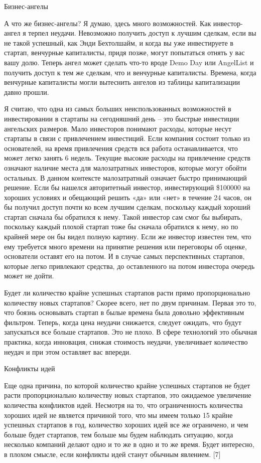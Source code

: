 \documentclass[ebook,12pt,oneside,openany]{memoir}
\begin{document}
Бизнес-ангелы

А что же бизнес-ангелы? Я думаю, здесь много возможностей. Как
инвестор-ангел я терпел неудачи. Невозможно получить доступ к лучшим
сделкам, если вы не такой успешный, как Энди Бехтолшайм, и когда вы
уже инвестируете в стартап, венчурные капиталисты, придя позже, могут
попытаться отнять у вас вашу долю. Теперь ангел может сделать что-то
вроде Demo Day или AngelList и получить доступ к тем же сделкам, что и
венчурные капиталисты. Времена, когда венчурные капиталисты могли
вытеснить ангелов из таблицы капитализации давно прошли.

Я считаю, что одна из самых больших неиспользованных возможностей в
инвестировании в стартапы на сегодняшний день – это быстрые инвестиции
ангельских размеров. Мало инвесторов понимают расходы, которые несут
стартапы в связи с привлечением инвестиций. Если компания состоит
только из основателей, на время привлечения средств вся работа
останавливается, что может легко занять 6 недель. Текущие высокие
расходы на привлечение средств означают наличие места для
малозатратных инвесторов, которые могут обойти остальных. В данном
контексте малозатратный означает быстро принимающий решение. Если бы
нашелся авторитетный инвестор, инвестирующий \$100000 на хороших
условиях и обещающий решить «да» или «нет» в течение 24 часов, он бы
получил доступ почти ко всем лучшим сделкам, поскольку каждый хороший
стартап сначала бы обратился к нему. Такой инвестор сам смог бы
выбирать, поскольку каждый плохой стартап тоже бы сначала обратился к
нему, но по крайней мере он бы видел полную картину. Если же инвестор
известен тем, что ему требуется много времени на принятие решения или
переговоры об оценке, основатели оставят его на потом. И в случае
самых перспективных стартапов, которые легко привлекают средства, до
оставленного на потом инвестора очередь может не дойти.

Будет ли количество крайне успешных стартапов расти прямо
пропорционально количеству новых стартапов? Скорее всего, нет по двум
причинам. Первая это то, что боязнь основывать стартап в былые времена
была довольно эффективным фильтром. Теперь, когда цена неудачи
снижается, следует ожидать, что будут запускаться все больше
стартапов. Это не плохо. В сфере технологий это обычная практика,
когда инновация, снижая стоимость неудачи, увеличивает количество
неудач и при этом оставляет вас впереди.

Конфликты идей

Еще одна причина, по которой количество крайне успешных стартапов не
будет расти пропорционально количеству новых стартапов, это ожидаемое
увеличение количества конфликтов идей. Несмотря на то, что
ограниченность количества хороших идей не является причиной того, что
мы имеем только 15 крайне успешных стартапов в год, количество хороших
идей все же ограничено, и чем больше будет стартапов, тем больше мы
будем наблюдать ситуацию, когда несколько компаний делают одно и то же
в одно и то же время. Будет интересно, в плохом смысле, если конфликты
идей станут обычным явлением. [7]
\end{document}
